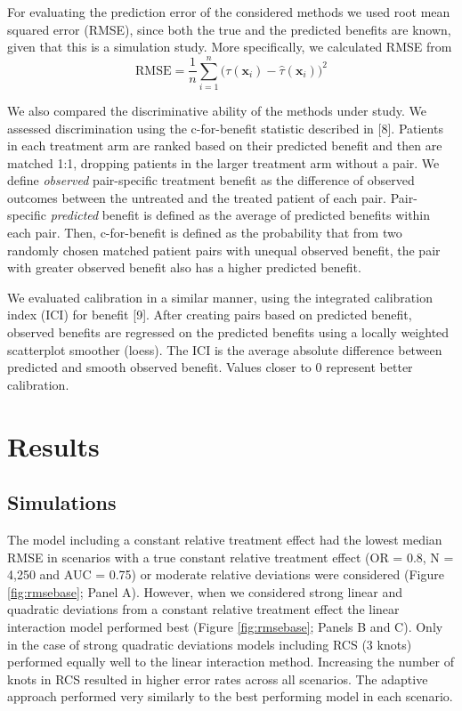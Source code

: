\documentclass{article}
\begin{document}
For evaluating the prediction error of the considered methods we used
root mean squared error (RMSE), since both the true and the predicted
benefits are known, given that this is a simulation study. More
specifically, we calculated RMSE from
\[\text{RMSE}=\frac{1}{n}\sum_{i=1}^n\big(\tau(\bm{x}_i) - \hat{\tau}(\bm{x}_i)\big)^2\]

We also compared the discriminative ability of the methods under study.
We assessed discrimination using the c-for-benefit statistic described
in {[}8{]}. Patients in each treatment arm are ranked based on their
predicted benefit and then are matched 1:1, dropping patients in the
larger treatment arm without a pair. We define \emph{observed}
pair-specific treatment benefit as the difference of observed outcomes
between the untreated and the treated patient of each pair.
Pair-specific \emph{predicted} benefit is defined as the average of
predicted benefits within each pair. Then, c-for-benefit is defined as
the probability that from two randomly chosen matched patient pairs with
unequal observed benefit, the pair with greater observed benefit also
has a higher predicted benefit.

We evaluated calibration in a similar manner, using the integrated
calibration index (ICI) for benefit {[}9{]}. After creating pairs based
on predicted benefit, observed benefits are regressed on the predicted
benefits using a locally weighted scatterplot smoother (loess). The ICI
is the average absolute difference between predicted and smooth observed
benefit. Values closer to \(0\) represent better calibration.

\hypertarget{results}{%
\section{Results}\label{results}}

\hypertarget{simulations}{%
\subsection{Simulations}\label{simulations}}

The model including a constant relative treatment effect had the lowest
median RMSE in scenarios with a true constant relative treatment effect
(OR = 0.8, N = 4,250 and AUC = 0.75) or moderate relative deviations
were considered (Figure \ref{fig:rmsebase}; Panel A). However, when we
considered strong linear and quadratic deviations from a constant
relative treatment effect the linear interaction model performed best
(Figure \ref{fig:rmsebase}; Panels B and C). Only in the case of strong
quadratic deviations models including RCS (3 knots) performed equally
well to the linear interaction method. Increasing the number of knots in
RCS resulted in higher error rates across all scenarios. The adaptive
approach performed very similarly to the best performing model in each
scenario.
\end{document}

